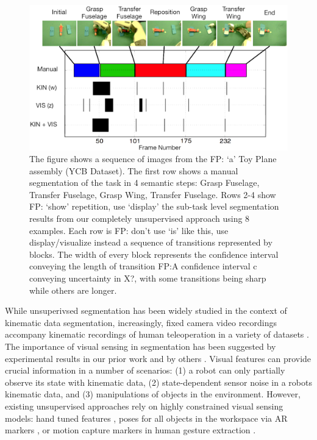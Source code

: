 \begin{figure}[ht]
\centering
\includegraphics[width=\linewidth]{figures/pr2_plane_assembly.png}
\caption{The figure shows a sequence of images from the {\color{blue} FP: `a'} Toy Plane assembly (YCB Dataset). The first row shows a
manual segmentation of the task in 4 semantic steps: Grasp Fuselage, Transfer Fuselage, Grasp Wing, Transfer Fuselage.
Rows 2-4 show {\color{blue} FP: `show' repetition, use `display'} the sub-task level segmentation results from our completely
unsupervised approach using 8 examples. Each row is {\color{blue} FP: don't use `is' like this, use display/visualize instead} a
sequence of transitions represented by blocks. The width of every block represents the confidence interval conveying the length of transition
{\color{blue} FP:A confidence interval c conveying uncertainty in X?}, with some transitions being sharp while others are longer.}
 \label{fig:pr2_toyplane}
\vspace{-10pt} 
\end{figure}

While unsuperivsed segmentation has been widely studied in the context of kinematic data segmentation, increasingly, fixed camera video recordings accompany kinematic recordings of human teleoperation in a variety of datasets \cite{hodgins2009guide, gao2014jigsaws, ofli2013berkeley}.
The importance of visual sensing in segmentation has been suggested by experimental results in our prior work \cite{krishnan2015tsc} and by others \cite{Niekum2015learning}.
Visual features can provide crucial information in a number of scenarios: (1) a robot can only partially observe its state with kinematic data, (2) state-dependent sensor noise in a robots kinematic data, and (3) manipulations of objects in the environment.
However, existing unsupervised approaches rely on highly constrained visual sensing models: hand tuned features \cite{krishnan2015tsc}, poses for all objects in the workspace via AR markers \cite{Niekum2015learning}, or motion capture markers in human gesture extraction \cite{kulic2011incremental}.

